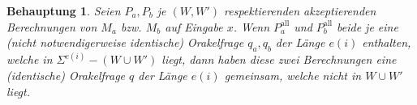 \documentclass[nofonts]{uebung}
\newtheorem{claim}[theorem]{Behauptung}
\theoremstyle{definition}
\begin{document}
\begin{claim}
    Seien $P_a, P_b$ je $(W, W')$ respektierenden akzeptierenden Berechnungen von $M_a$ bzw. $M_b$ auf Eingabe $x$.
    Wenn $P^\mathrm{all}_a$ und $P^\mathrm{all}_b$ beide je eine (nicht notwendigerweise identische) Orakelfrage $q_a, q_b$ der Länge $e(i)$ enthalten, welche in $\Sigma^{e(i)}-(W\cup W')$ liegt, dann haben diese zwei Berechnungen eine (identische) Orakelfrage $q$ der Länge $e(i)$ gemeinsam, welche nicht in $W\cup W'$ liegt.
\end{claim}
\end{document}
